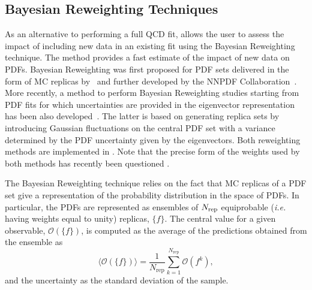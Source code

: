 \subsection{Bayesian Reweighting Techniques}

As an alternative to performing a full QCD fit, \fitter allows the user to assess the impact of including new
data in an existing fit using the Bayesian Reweighting technique. The method
provides a fast estimate of the impact of new data on PDFs. 
Bayesian Reweighting was first proposed for PDF sets delivered in the form of MC replicas by~\cite{Giele:1998gw} 
and further developed by the NNPDF Collaboration~\cite{Ball:2011gg,Ball:2010gb}. 
More recently, a method to perform Bayesian Reweighting studies starting from PDF fits for which uncertainties
are provided in the eigenvector representation has been also developed~\cite{Watt:2012tq}. The latter is 
based on generating replica sets by introducing Gaussian fluctuations on the central PDF set with a variance 
determined by the PDF uncertainty given by the eigenvectors. Both reweighting methods are implemented in \fitter.
Note that the precise form of the weights used by both methods has recently been questioned \cite{Sato:2013ika,Paukkunen:2014zia}.

The Bayesian Reweighting technique relies on the fact that MC replicas of a PDF set give 
a representation of the probability distribution in the space of PDFs. In particular, the PDFs are represented 
as ensembles of $N_{\rm rep}$ equiprobable ({\em i.e.} having weights equal to unity) replicas, $\{f\}$. 
The central value for a given observable, $\mathcal{O}(\{f\})$, is computed as the average of the 
predictions obtained from the ensemble as
\begin{equation}
\langle\mathcal{O}(\{f\})\rangle =  \frac{1}{N_{\mathrm{rep}}} \sum_{k=1}^{N_{\mathrm{rep}}} \mathcal{O}(f^{k}),
\end{equation}
and the uncertainty as the standard deviation of the sample.

